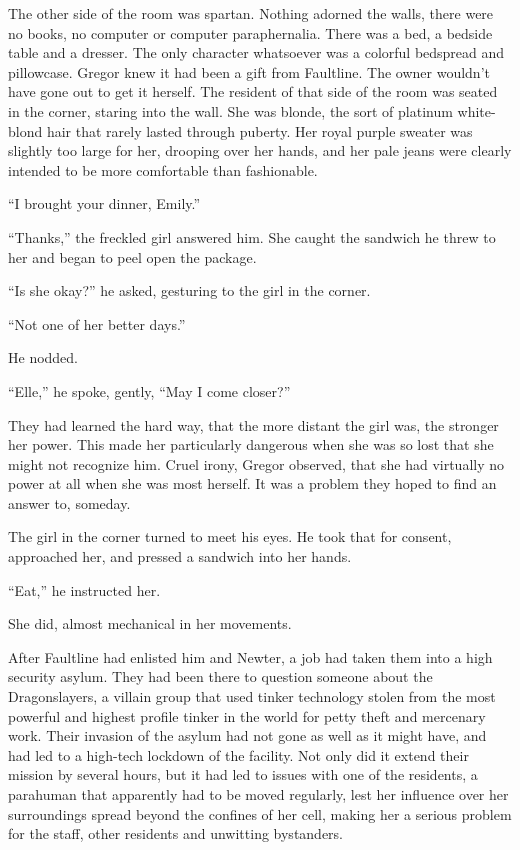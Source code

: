 The other side of the room was spartan.  Nothing adorned the walls, there were no books, no computer or computer paraphernalia.  There was a bed, a bedside table and a dresser.  The only character whatsoever was a colorful bedspread and pillowcase.  Gregor knew it had been a gift from Faultline.  The owner wouldn't have gone out to get it herself.  The resident of that side of the room was seated in the corner, staring into the wall.  She was blonde, the sort of platinum white-blond hair that rarely lasted through puberty.  Her royal purple sweater was slightly too large for her, drooping over her hands, and her pale jeans were clearly intended to be more comfortable than fashionable.



``I brought your dinner, Emily.''



``Thanks,'' the freckled girl answered him.  She caught the sandwich he threw to her and began to peel open the package.



``Is she okay?'' he asked, gesturing to the girl in the corner.



``Not one of her better days.''



He nodded.



``Elle,'' he spoke, gently, ``May I come closer?''



They had learned the hard way, that the more distant the girl was, the stronger her power.  This made her particularly dangerous when she was so lost that she might not recognize him.  Cruel irony, Gregor observed, that she had virtually no power at all when she was most herself.  It was a problem they hoped to find an answer to, someday.



The girl in the corner turned to meet his eyes.  He took that for consent, approached her, and pressed a sandwich into her hands.



``Eat,'' he instructed her.



She did, almost mechanical in her movements.



After Faultline had enlisted him and Newter, a job had taken them into a high security asylum.  They had been there to question someone about the Dragonslayers, a villain group that used tinker technology stolen from the most powerful and highest profile tinker in the world for petty theft and mercenary work.  Their invasion of the asylum had not gone as well as it might have, and had led to a high-tech lockdown of the facility.  Not only did it extend their mission by several hours, but it had led to issues with one of the residents, a parahuman that apparently had to be moved regularly, lest her influence over her surroundings spread beyond the confines of her cell, making her a serious problem for the staff, other residents and unwitting bystanders.




